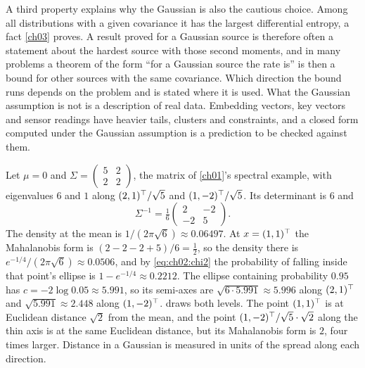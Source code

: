 A third property explains why the Gaussian is also the cautious choice. Among
all distributions with a given covariance it has the largest differential
entropy, a fact \cref{ch03} proves. A result proved for a Gaussian source is
therefore often a statement about the hardest source with those second
moments, and in many problems a theorem of the form ``for a Gaussian source
the rate is'' is then a bound for other sources with the same covariance. Which direction the
bound runs depends on the problem and is stated where it is used. What the
Gaussian assumption is not is a description of real data. Embedding vectors,
key vectors and sensor readings have heavier tails, clusters and constraints,
and a closed form computed under the Gaussian assumption is a prediction to be
checked against them.

\begin{example}\label{ex:ch02:mvn}
Let $\mu=0$ and $\Sigma=\begin{pmatrix}5&2\\2&2\end{pmatrix}$, the matrix of
\cref{ch01}'s spectral example, with eigenvalues $6$ and $1$ along
$(2,1)^{\top}/\sqrt5$ and $(1,-2)^{\top}/\sqrt5$. Its determinant is $6$ and
\[
\Sigma^{-1}=\tfrac16\begin{pmatrix}2&-2\\-2&5\end{pmatrix}.
\]
The density at the mean is $1/(2\pi\sqrt6)\approx0.06497$. At $x=(1,1)^{\top}$ the
Mahalanobis form is $(2-2-2+5)/6=\tfrac12$, so the density there is
$e^{-1/4}/(2\pi\sqrt6)\approx0.0506$, and by \cref{eq:ch02:chi2} the
probability of falling inside that point's ellipse is $1-e^{-1/4}\approx0.2212$.
The ellipse containing probability $0.95$ has $c=-2\log0.05\approx5.991$, so
its semi-axes are $\sqrt{6\cdot5.991}\approx5.996$ along $(2,1)^{\top}$ and
$\sqrt{5.991}\approx2.448$ along $(1,-2)^{\top}$.  draws both
levels. The point $(1,1)^{\top}$ is at Euclidean distance $\sqrt2$ from the mean, and
the point $(1,-2)^{\top}/\sqrt5\cdot\sqrt2$ along the thin axis is at the same
Euclidean distance, but its Mahalanobis form is $2$, four times larger. Distance
in a Gaussian is measured in units of the spread along each direction.
\end{example}

